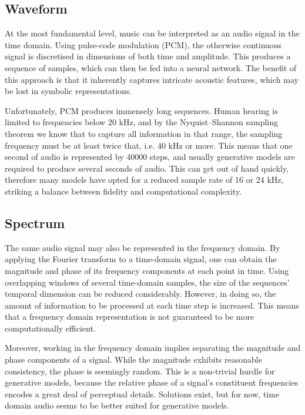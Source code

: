 \documentclass[../../report.tex]{subfiles}
\begin{document}

\subsection{Waveform}

At the most fundamental level, music can be interpreted as an audio signal in
the time domain. Using pulse-code modulation (PCM), the otherwise continuous
signal is discretised in dimensions of both time and amplitude. This produces a
sequence of samples, which can then be fed into a neural network. The benefit of
this approach is that it inherently captures intricate acoustic features, which
may be lost in symbolic representations. \cite{Dieleman2020}

Unfortunately, PCM produces immensely long sequences. Human hearing is limited
to frequencies below \num{20} kHz, and by the Nyquist--Shannon sampling theorem
we know that to capture all information in that range, the sampling frequency
must be at least twice that, i.e. \num{40} kHz or more. This means that one
second of audio is represented by \num{40000} steps, and usually generative
models are required to produce several seconds of audio. This can get out of
hand quickly, therefore many models have opted for a reduced sample rate of
\num{16} or \num{24} kHz, striking a balance between fidelity and computational
complexity. \cite{Dieleman2020}


\subsection{Spectrum}

The same audio signal may also be represented in the frequency domain. By
applying the Fourier transform to a time-domain signal, one can obtain the
magnitude and phase of its frequency components at each point in time. Using
overlapping windows of several time-domain samples, the size of the sequences'
temporal dimension can be reduced considerably. However, in doing so, the amount
of information to be processed at each time step is increased. This means that a
frequency domain representation is not guaranteed to be more computationally
efficient. \cite{Dieleman2020}

Moreover, working in the frequency domain implies separating the
magnitude and phase components of a signal. While the magnitude exhibits
reasonable consistency, the phase is seemingly random. This is a non-trivial
hurdle for generative models, because the relative phase of a signal's
constituent frequencies encodes a great deal of perceptual details. Solutions
exist, but for now, time domain audio seems to be better suited for generative
models. \cite{Dieleman2020}


\end{document}
